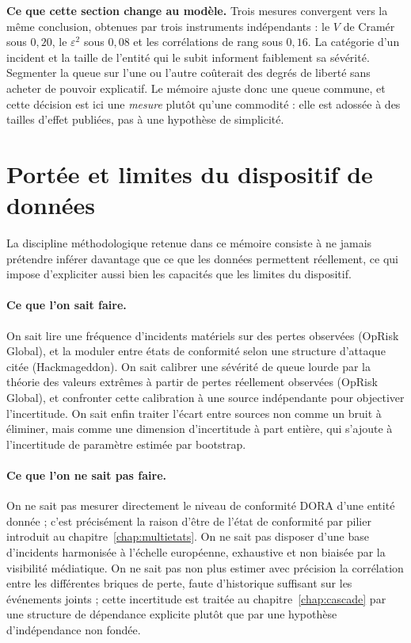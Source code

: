 \begin{cle}
\textbf{Ce que cette section change au modèle.} Trois mesures convergent vers la même
conclusion, obtenues par trois instruments indépendants : le $V$ de Cramér sous $0{,}20$, le
$\varepsilon^2$ sous $0{,}08$ et les corrélations de rang sous $0{,}16$. La catégorie d'un
incident et la taille de l'entité qui le subit informent faiblement sa sévérité. Segmenter la
queue sur l'une ou l'autre coûterait des degrés de liberté sans acheter de pouvoir explicatif.
Le mémoire ajuste donc une queue commune, et cette décision est ici une \emph{mesure} plutôt
qu'une commodité : elle est adossée à des tailles d'effet publiées, pas à une hypothèse de
simplicité.
\end{cle}


\section{Portée et limites du dispositif de données}
\label{sec:portee-donnees}

La discipline méthodologique retenue dans ce mémoire consiste à ne jamais
prétendre inférer davantage que ce que les données permettent réellement, ce
qui impose d'expliciter aussi bien les capacités que les limites du dispositif.

\paragraph{Ce que l'on sait faire.} On sait lire une fréquence d'incidents
matériels sur des pertes observées (OpRisk Global), et la moduler entre états de
conformité selon une structure d'attaque citée (Hackmageddon).
On sait calibrer une sévérité de queue lourde par la théorie des valeurs
extrêmes à partir de pertes réellement observées (OpRisk Global), et
confronter cette calibration à une source indépendante pour objectiver
l'incertitude. On sait enfin traiter l'écart entre sources non comme un bruit
à éliminer, mais comme une dimension d'incertitude à part entière, qui
s'ajoute à l'incertitude de paramètre estimée par bootstrap.

\paragraph{Ce que l'on ne sait pas faire.} On ne sait pas mesurer directement
le niveau de conformité DORA d'une entité donnée ; c'est précisément la
raison d'être de l'état de conformité par pilier introduit au
chapitre~\ref{chap:multietats}. On ne sait pas
disposer d'une base d'incidents harmonisée à l'échelle européenne, exhaustive
et non biaisée par la visibilité médiatique. On ne sait pas non plus estimer
avec précision la corrélation entre les différentes briques de perte,
faute d'historique suffisant sur les événements joints ; cette incertitude
est traitée au chapitre~\ref{chap:cascade} par une structure de dépendance explicite plutôt que
par une hypothèse d'indépendance non fondée.

